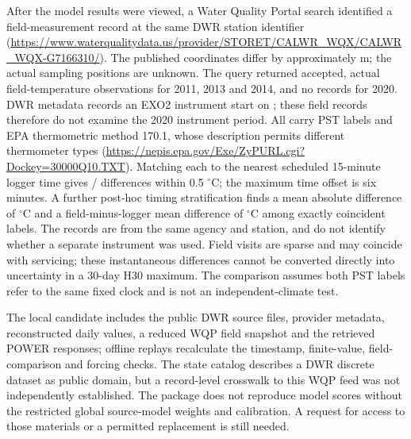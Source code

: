After the model results were viewed, a Water Quality Portal search identified a field-measurement record at the same DWR station identifier (\url{https://www.waterqualitydata.us/provider/STORET/CALWR_WQX/CALWR_WQX-G7166310/}). The published coordinates differ by approximately \TruckeeFieldCoordinateDistance{} m; the actual sampling positions are unknown. The query returned \TruckeeFieldCount{} accepted, actual field-temperature observations for 2011, 2013 and 2014, and no records for 2020. DWR metadata records an EXO2 instrument start on \TruckeeInstrumentChangeDate{}; these field records therefore do not examine the 2020 instrument period. All carry PST labels and EPA thermometric method 170.1, whose description permits different thermometer types (\url{https://nepis.epa.gov/Exe/ZyPURL.cgi?Dockey=30000Q10.TXT}). Matching each to the nearest scheduled 15-minute logger time gives \TruckeeFieldWithinHalf/\TruckeeFieldCount{} differences within 0.5 $^{\circ}$C; the maximum time offset is six minutes. A further post-hoc timing stratification finds a mean absolute difference of \TruckeeFieldExactMAE{} $^{\circ}$C and a field-minus-logger mean difference of \TruckeeFieldExactBias{} $^{\circ}$C among \TruckeeFieldExactCount{} exactly coincident labels. The records are from the same agency and station, and do not identify whether a separate instrument was used. Field visits are sparse and may coincide with servicing; these instantaneous differences cannot be converted directly into uncertainty in a 30-day H30 maximum. The comparison assumes both PST labels refer to the same fixed clock and is not an independent-climate test.

\begin{table}[ht]\caption{Truckee exploratory annual H30 scores on 72 controlled masks from one station and four years. MAE, bias, width and interval score are $^{\circ}$C; coverage is percent for the nominal 90\% interval. The plug-in method supplies no interval.}\label{tab:truckee-exploratory}\centering\small
{}\end{table}

The local candidate includes the public DWR source files, provider metadata, reconstructed daily values, a reduced WQP field snapshot and the retrieved POWER responses; offline replays recalculate the timestamp, finite-value, field-comparison and forcing checks. The state catalog describes a DWR discrete dataset as public domain, but a record-level crosswalk to this WQP feed was not independently established. The package does not reproduce model scores without the restricted global source-model weights and calibration. A request for access to those materials or a permitted replacement is still needed.
